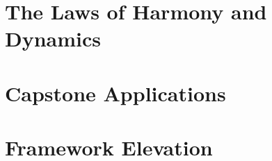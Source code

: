 \documentclass[12pt, a4paper]{article}
\begin{document}
\part{The Laws of Harmony and Dynamics}

\newpage

\newpage

\newpage

\newpage

\newpage

\newpage

\newpage

\newpage

\newpage

\newpage

\newpage

\newpage

\newpage

\newpage

\newpage

\part{Capstone Applications}

\newpage


\newpage


\part{Framework Elevation}

\newpage

\newpage

\end{document}
